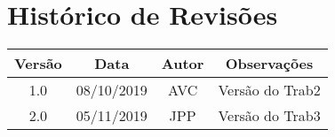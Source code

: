 \chapter*{\centering Histórico de Revisões}

\begin{center}
    \begin{tabular}{|c|c|c|c|}
        \hline
        Versão & Data       & Autor & Observações                                      \\
        \hline
        1.0    & 08/10/2019 & AVC   & Versão do Trab2                                  \\
        \hline
        2.0    & 05/11/2019 & JPP   & Versão do Trab3                                  \\
        \hline
    \end{tabular}
\end{center}
